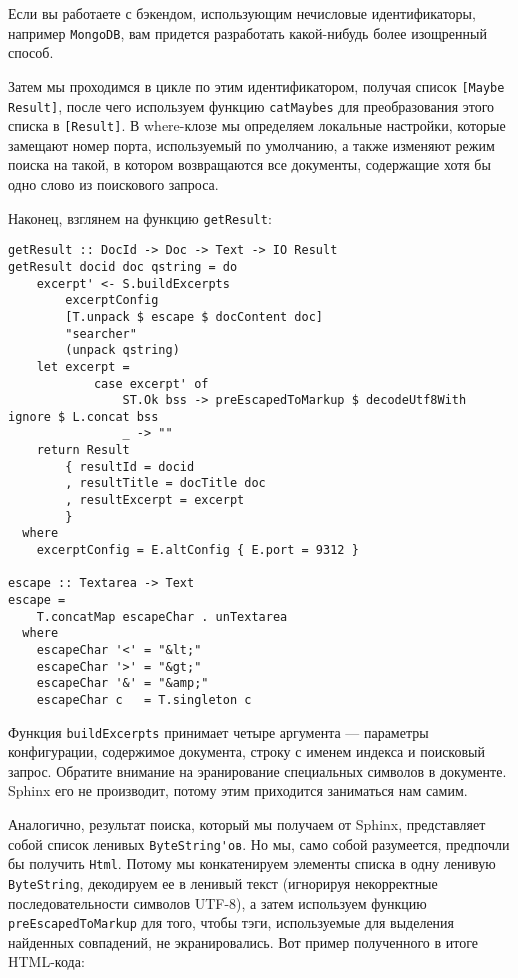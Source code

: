 Если вы работаете с бэкендом, использующим нечисловые идентификаторы, например \lstinline'MongoDB', вам придется разработать какой-нибудь более изощренный способ.

Затем мы проходимся в цикле по этим идентификатором, получая список \lstinline'[Maybe Result]', после чего используем функцию \lstinline'catMaybes' для преобразования этого списка в \lstinline'[Result]'. В where-клозе мы определяем локальные настройки, которые замещают номер порта, используемый по умолчанию, а также изменяют режим поиска на такой, в котором возвращаются все документы, содержащие хотя бы одно слово из поискового запроса. %

Наконец, взглянем на функцию \lstinline'getResult':

\begin{lstlisting}
getResult :: DocId -> Doc -> Text -> IO Result
getResult docid doc qstring = do
    excerpt' <- S.buildExcerpts
        excerptConfig
        [T.unpack $ escape $ docContent doc]
        "searcher"
        (unpack qstring)
    let excerpt =
            case excerpt' of
                ST.Ok bss -> preEscapedToMarkup $ decodeUtf8With ignore $ L.concat bss
                _ -> ""
    return Result
        { resultId = docid
        , resultTitle = docTitle doc
        , resultExcerpt = excerpt
        }
  where
    excerptConfig = E.altConfig { E.port = 9312 }

escape :: Textarea -> Text
escape =
    T.concatMap escapeChar . unTextarea
  where
    escapeChar '<' = "&lt;"
    escapeChar '>' = "&gt;"
    escapeChar '&' = "&amp;"
    escapeChar c   = T.singleton c
\end{lstlisting}

Функция \lstinline'buildExcerpts' принимает четыре аргумента --- параметры конфигурации, содержимое документа, строку с именем индекса и поисковый запрос. Обратите внимание на эранирование специальных символов в документе. Sphinx его не производит, потому этим приходится заниматься нам самим.

Аналогично, результат поиска, который мы получаем от Sphinx, представляет собой список ленивых \lstinline`ByteString'ов`. Но мы, само собой разумеется, предпочли бы получить \lstinline'Html'. Потому мы конкатенируем элементы списка в одну ленивую \lstinline'ByteString', декодируем ее в ленивый текст (игнорируя некорректные последовательности символов UTF-8), а затем используем функцию \lstinline'preEscapedToMarkup' для того, чтобы тэги, используемые для выделения найденных совпадений, не экранировались. Вот пример полученного в итоге HTML-кода:


